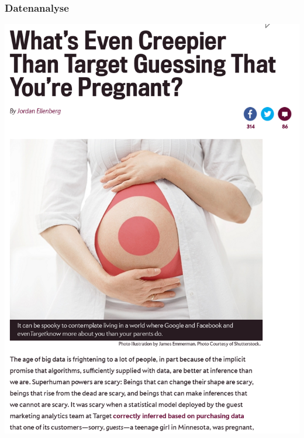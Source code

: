 \documentclass[12pt]{beamer}
\begin{document}
\begin{frame}
  \frametitle{Datenanalyse}
  \pause
  \begin{center}
    \includegraphics[height=0.8\textheight]{img/pregnant.png}
  \end{center}
\end{frame}
\end{document}
